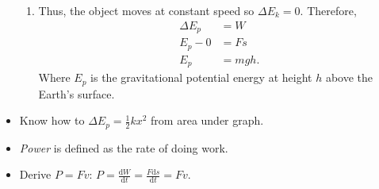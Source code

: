 \documentclass[oneside]{book}
\begin{document}
\begin{itemize}
\begin{enumerate}
        \item Thus, the object moves at constant speed so \(\Delta E_k=0\). Therefore, 
        \begin{align*}
            \Delta E_p&= W\\
            E_p-0&=Fs\\
            E_p&=mgh.
        \end{align*}
        Where \(E_p\) is the gravitational potential energy at height \(h\) above the Earth's surface.
    \end{enumerate}
    \item Know how to \(\Delta E_p=\frac{1}{2}kx^2\) from area under graph.
    \item \emph{Power} is defined as the rate of doing work.
    \item Derive \(P=Fv\): \(P=\frac{\text{d}W}{\text{d}t}=\frac{F\text{d}s}{\text{d}t}=Fv\).
\end{itemize}
\end{document}

